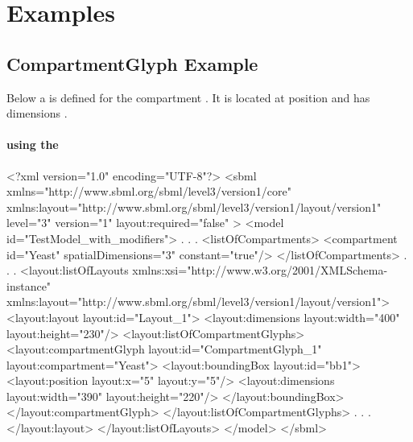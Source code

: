 
\section{Examples}
\label{examples}
\subsection{CompartmentGlyph Example}
Below a \CompartmentGlyph is defined for the compartment . 
It is located at position  and has dimensions 
. 

\label{example:compartmentglyph}
\paragraph{\sbmlthreecore using the \LayoutPackage}
\begin{example}
<?xml version="1.0" encoding="UTF-8"?>
<sbml xmlns="http://www.sbml.org/sbml/level3/version1/core" 
		xmlns:layout="http://www.sbml.org/sbml/level3/version1/layout/version1" 
		level="3" version="1" layout:required="false" >		
  <model id="TestModel_with_modifiers">
                .
                .
                .
    <listOfCompartments>
      <compartment id="Yeast" spatialDimensions="3" constant="true"/>
    </listOfCompartments>	
                .
                .
                .
    <layout:listOfLayouts xmlns:xsi="http://www.w3.org/2001/XMLSchema-instance" 
		xmlns:layout="http://www.sbml.org/sbml/level3/version1/layout/version1">
      <layout:layout layout:id="Layout_1">
        <layout:dimensions layout:width="400" layout:height="230"/>
        <layout:listOfCompartmentGlyphs>
          <layout:compartmentGlyph layout:id="CompartmentGlyph_1" layout:compartment="Yeast">
            <layout:boundingBox layout:id="bb1">
              <layout:position layout:x="5" layout:y="5"/>
              <layout:dimensions layout:width="390" layout:height="220"/>
            </layout:boundingBox>
          </layout:compartmentGlyph>
        </layout:listOfCompartmentGlyphs>
                .
                .
                .
			</layout:layout>
		</layout:listOfLayouts>
  </model>
</sbml>
\end{example}
